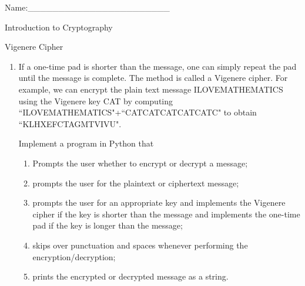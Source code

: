 \documentclass[12pt]{amsart}
\theoremstyle{definition}
\theoremstyle{remark}
\numberwithin{equation}{section}
\begin{document}
\begin{flushright}
Name:\_\_\_\_\_\_\_\_\_\_\_\_\_\_\_\_\_\_\_\_\_\_\_
\end{flushright}
\vspace{10pt}
\begin{center}
Introduction to Cryptography

Vigenere Cipher
\end{center}


\begin{enumerate}
\item If a one-time pad is shorter than the message, one can simply repeat the pad until the message is complete. The method is called a Vigenere cipher. For example, we can encrypt the plain text message ILOVEMATHEMATICS using the Vigenere key CAT by computing ``ILOVEMATHEMATICS"+``CATCATCATCATCATC" to obtain ``KLHXEFCTAGMTVIVU".

Implement a program in Python that 
\begin{enumerate}
\item Prompts the user whether to encrypt or decrypt a message;
\item prompts the user for the plaintext or ciphertext message;
\item prompts the user for an appropriate key and implements the Vigenere cipher if the key is shorter than the message and implements the one-time pad if the key is longer than the message;
\item skips over punctuation and spaces whenever performing the encryption/decryption;
\item prints the encrypted or decrypted message as a string.
\end{enumerate}

\end{enumerate}
\vfill
\end{document}

